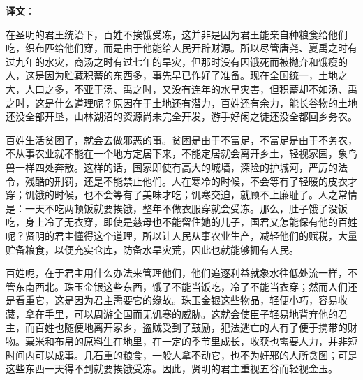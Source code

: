 \documentclass[12pt,UTF-8,openany,a4]{ctexbook}
\begin{document}
\newpage

\begin{Large}
   \noindent \textbf{译文}：
\end{Large}

\vspace{1em}

\begin{large}\yiwen
    
    在圣明的君王统治下，百姓不挨饿受冻，这并非是因为君王能亲自种粮食给他们吃，织布匹给他们穿，而是由于他能给人民开辟财源。所以尽管唐尧、夏禹之时有过九年的水灾，商汤之时有过七年的旱灾，但那时没有因饿死而被抛弃和饿瘦的人，这是因为贮藏积蓄的东西多，事先早已作好了准备。现在全国统一，土地之大，人口之多，不亚于汤、禹之时，又没有连年的水旱灾害，但积蓄却不如汤、禹之时，这是什么道理呢？原因在于土地还有潜力，百姓还有余力，能长谷物的土地还没全部开垦，山林湖沼的资源尚未完全开发，游手好闲之徒还没全都回乡务农。
    
    百姓生活贫困了，就会去做邪恶的事。贫困是由于不富足，不富足是由于不务农，不从事农业就不能在一个地方定居下来，不能定居就会离开乡土，轻视家园，象鸟兽一样四处奔散。这样的话，国家即使有高大的城墙，深险的护城河，严厉的法令，残酷的刑罚，还是不能禁止他们。人在寒冷的时候，不会等有了轻暖的皮衣才穿；饥饿的时候，也不会等有了美味才吃；饥寒交迫，就顾不上廉耻了。人之常情是：一天不吃两顿饭就要挨饿，整年不做衣服穿就会受冻。那么，肚子饿了没饭吃，身上冷了无衣穿，即使是慈母也不能留住她的儿子，国君又怎能保有他的百姓呢？贤明的君主懂得这个道理，所以让人民从事农业生产，减轻他们的赋税，大量贮备粮食，以便充实仓库，防备水旱灾荒，因此也就能够拥有人民。
    
    百姓呢，在于君主用什么办法来管理他们，他们追逐利益就象水往低处流一样，不管东南西北。珠玉金银这些东西，饿了不能当饭吃，冷了不能当衣穿；然而人们还是看重它，这是因为君主需要它的缘故。珠玉金银这些物品，轻便小巧，容易收藏，拿在手里，可以周游全国而无饥寒的威胁。这就会使臣子轻易地背弃他的君主，而百姓也随便地离开家乡，盗贼受到了鼓励，犯法逃亡的人有了便于携带的财物。粟米和布帛的原料生在地里，在一定的季节里成长，收获也需要人力，并非短时间内可以成事。几石重的粮食，一般人拿不动它，也不为奸邪的人所贪图；可是这些东西一天得不到就要挨饿受冻。因此，贤明的君主重视五谷而轻视金玉。
    

\end{large}
\end{document}
